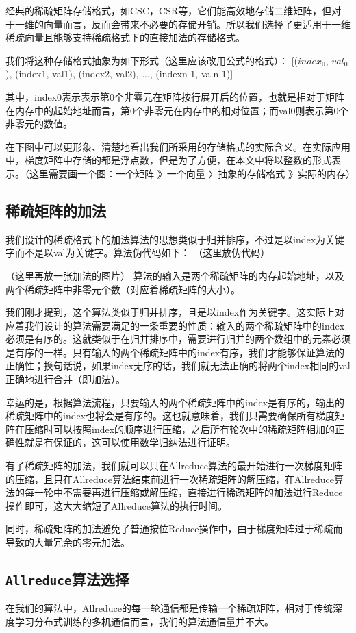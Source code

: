 经典的稀疏矩阵存储格式，如CSC，CSR等，它们能高效地存储二维矩阵，但对于一维的向量而言，反而会带来不必要的存储开销。所以我们选择了更适用于一维稀疏向量且能够支持稀疏格式下的直接加法的存储格式。

我们将这种存储格式抽象为如下形式（这里应该改用公式的格式）：
[($index_0$, $val_0$), (index1, val1), (index2, val2), ..., (indexn-1, valn-1)]

其中，index0表示表示第0个非零元在矩阵按行展开后的位置，也就是相对于矩阵在内存中的起始地址而言，第0个非零元在内存中的相对位置；而val0则表示第0个非零元的数值。

在下图中可以更形象、清楚地看出我们所采用的存储格式的实际含义。在实际应用中，梯度矩阵中存储的都是浮点数，但是为了方便，在本文中将以整数的形式表示。（这里需要画一个图：一个矩阵-》一个向量-〉抽象的存储格式-》实际的内存）

\subsection{稀疏矩阵的加法}
我们设计的稀疏格式下的加法算法的思想类似于归并排序，不过是以index为关键字而不是以val为关键字。算法伪代码如下：
（这里放伪代码）

（这里再放一张加法的图片）
算法的输入是两个稀疏矩阵的内存起始地址，以及两个稀疏矩阵中非零元个数（对应着稀疏矩阵的大小）。

我们刚才提到，这个算法类似于归并排序，且是以index作为关键字。这实际上对应着我们设计的算法需要满足的一条重要的性质：输入的两个稀疏矩阵中的index必须是有序的。这就类似于在归并排序中，需要进行归并的两个数组中的元素必须是有序的一样。只有输入的两个稀疏矩阵中的index有序，我们才能够保证算法的正确性；换句话说，如果index无序的话，我们就无法正确的将两个index相同的val正确地进行合并（即加法）。

幸运的是，根据算法流程，只要输入的两个稀疏矩阵中的index是有序的，输出的稀疏矩阵中的index也将会是有序的。这也就意味着，我们只需要确保所有梯度矩阵在压缩时可以按照index的顺序进行压缩，之后所有轮次中的稀疏矩阵相加的正确性就是有保证的，这可以使用数学归纳法进行证明。

有了稀疏矩阵的加法，我们就可以只在Allreduce算法的最开始进行一次梯度矩阵的压缩，且只在Allreduce算法结束前进行一次稀疏矩阵的解压缩，在Allreduce算法的每一轮中不需要再进行压缩或解压缩，直接进行稀疏矩阵的加法进行Reduce操作即可，这大大缩短了Allreduce算法的执行时间。

同时，稀疏矩阵的加法避免了普通按位Reduce操作中，由于梯度矩阵过于稀疏而导致的大量冗余的零元加法。

\subsection{\texttt{Allreduce}算法选择}
在我们的算法中，Allreduce的每一轮通信都是传输一个稀疏矩阵，相对于传统深度学习分布式训练的多机通信而言，我们的算法通信量并不大。


